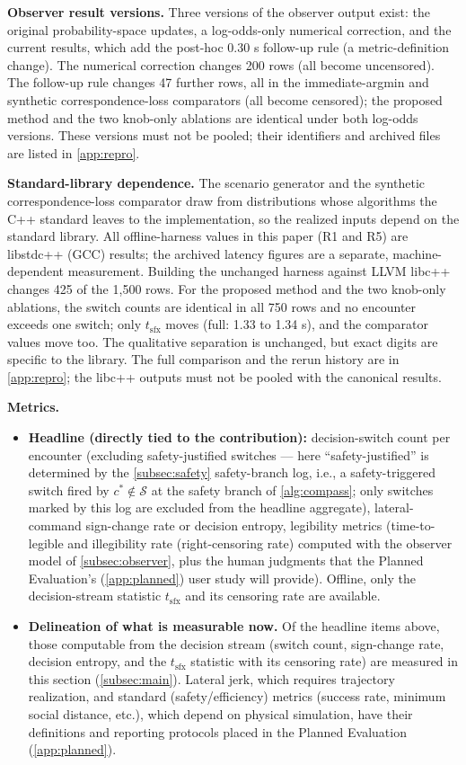 \noindent\textbf{Observer result versions.} Three versions of the observer output exist: the original probability-space updates, a log-odds-only numerical correction, and the current results, which add the post-hoc 0.30 s follow-up rule (a metric-definition change). The numerical correction changes 200 rows (all become uncensored). The follow-up rule changes 47 further rows, all in the immediate-argmin and synthetic correspondence-loss comparators (all become censored); the proposed method and the two knob-only ablations are identical under both log-odds versions. These versions must not be pooled; their identifiers and archived files are listed in \cref{app:repro}.

\noindent\textbf{Standard-library dependence.} The scenario generator and the synthetic correspondence-loss comparator draw from  distributions whose algorithms the C++ standard leaves to the implementation, so the realized inputs depend on the standard library. All offline-harness values in this paper (R1 and R5) are libstdc++ (GCC) results; the archived latency figures are a separate, machine-dependent measurement. Building the unchanged harness against LLVM libc++ changes 425 of the 1,500 rows. For the proposed method and the two knob-only ablations, the switch counts are identical in all 750 rows and no encounter exceeds one switch; only $t_{\text{sfx}}$ moves (full: 1.33 to 1.34 s), and the comparator values move too. The qualitative separation is unchanged, but exact digits are specific to the library. The full comparison and the rerun history are in \cref{app:repro}; the libc++ outputs must not be pooled with the canonical results.

\noindent\textbf{Metrics.}
\begin{itemize}
\item \textbf{Headline (directly tied to the contribution):} decision-switch count per encounter (excluding safety-justified switches --- here ``safety-justified'' is determined by the \cref{subsec:safety} safety-branch log, i.e., a safety-triggered switch fired by $c^* \notin \mathcal{S}$ at the safety branch of \cref{alg:compass}; only switches marked by this log are excluded from the headline aggregate), lateral-command sign-change rate or decision entropy, legibility metrics (time-to-legible and illegibility rate (right-censoring rate) computed with the observer model of \cref{subsec:observer}, plus the human judgments that the Planned Evaluation's (\cref{app:planned}) user study will provide). Offline, only the decision-stream statistic $t_{\text{sfx}}$ and its censoring rate are available.
\item \textbf{Delineation of what is measurable now.} Of the headline items above, those computable from the decision stream (switch count, sign-change rate, decision entropy, and the $t_{\text{sfx}}$ statistic with its censoring rate) are measured in this section (\cref{subsec:main}). Lateral jerk, which requires trajectory realization, and standard (safety/efficiency) metrics (success rate, minimum social distance, etc.), which depend on physical simulation, have their definitions and reporting protocols placed in the Planned Evaluation (\cref{app:planned}).
\end{itemize}

